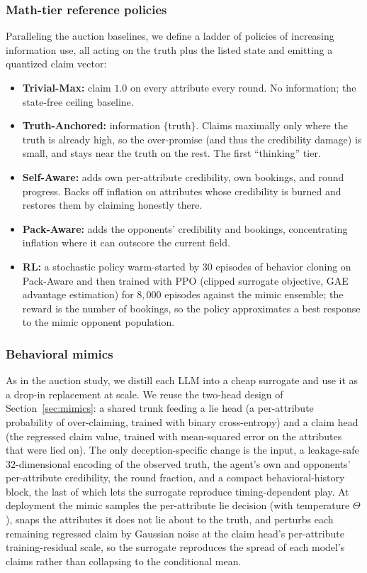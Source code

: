 \documentclass[conference]{IEEEtran}
\begin{document}
\subsubsection{Math-tier reference policies}
\label{sec:dec5-tiers}
Paralleling the auction baselines, we define a ladder of policies of increasing information use, all acting on the truth plus the listed state and emitting a quantized claim vector:
\begin{itemize}
\item \textbf{Trivial-Max:} claim $1.0$ on every attribute every round. No information; the state-free ceiling baseline.
\item \textbf{Truth-Anchored:} information $\{$truth$\}$. Claims maximally only where the truth is already high, so the over-promise (and thus the credibility damage) is small, and stays near the truth on the rest. The first ``thinking'' tier.
\item \textbf{Self-Aware:} adds own per-attribute credibility, own bookings, and round progress. Backs off inflation on attributes whose credibility is burned and restores them by claiming honestly there.
\item \textbf{Pack-Aware:} adds the opponents' credibility and bookings, concentrating inflation where it can outscore the current field.
\item \textbf{RL:} a stochastic policy warm-started by $30$ episodes of behavior cloning on Pack-Aware and then trained with PPO (clipped surrogate objective, GAE advantage estimation) for $8{,}000$ episodes against the mimic ensemble; the reward is the number of bookings, so the policy approximates a best response to the mimic opponent population.
\end{itemize}

\subsubsection{Behavioral mimics}
\label{sec:dec5-mimics}
As in the auction study, we distill each LLM into a cheap surrogate and use it as a drop-in replacement at scale. We reuse the two-head design of Section~\ref{sec:mimics}: a shared trunk feeding a lie head (a per-attribute probability of over-claiming, trained with binary cross-entropy) and a claim head (the regressed claim value, trained with mean-squared error on the attributes that were lied on). The only deception-specific change is the input, a leakage-safe $32$-dimensional encoding of the observed truth, the agent's own and opponents' per-attribute credibility, the round fraction, and a compact behavioral-history block, the last of which lets the surrogate reproduce timing-dependent play. At deployment the mimic samples the per-attribute lie decision (with temperature $\Theta$), snaps the attributes it does not lie about to the truth, and perturbs each remaining regressed claim by Gaussian noise at the claim head's per-attribute training-residual scale, so the surrogate reproduces the spread of each model's claims rather than collapsing to the conditional mean.
\end{document}
